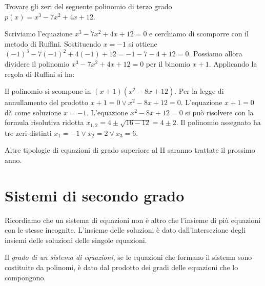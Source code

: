 \begin{esempio}
Trovare gli zeri del seguente polinomio di terzo grado \(p(x)=x^3-7x^2+4x+12\).

Scriviamo l'equazione \(x^3-7x^2+4x+12=0\) e cerchiamo di scomporre con il metodo 
di Ruffini. Sostituendo \(x=-1\) si ottiene 
\((-1)^3-7(-1)^2+4(-1)+12=-1-7-4+12=0\). 
Possiamo allora dividere il polinomio \(x^3-7x^2+4x+12=0\) per il binomio \(x+1\). 
Applicando la regola di Ruffini si ha:
\begin{center}

\end{center}
Il polinomio si scompone in \((x+1)(x^2-8x+12)\). Per la legge di annullamento 
del 
prodotto \(x+1=0\vee x^2-8x+12=0\). L'equazione \(x+1=0\) dà come soluzione \(x=-1\). 
L'equazione \(x^2-8x+12=0\) si può risolvere con la formula risolutiva ridotta 
\(x_{1,2}=4\pm \sqrt{16-12}=4\pm 2\). Il polinomio assegnato ha tre zeri distinti 
\(x_1=-1\vee x_2=2\vee x_3=6\).
\end{esempio}


Altre tipologie di equazioni di grado superiore al II saranno trattate il 
prossimo anno.

\section{Sistemi di secondo grado}
\label{sec:eq2gr_sistemi}

Ricordiamo che un sistema di equazioni non è altro che l'insieme di più 
equazioni con le stesse incognite. L'insieme delle soluzioni è dato 
dall'intersezione degli insiemi delle soluzioni delle singole equazioni.

\begin{definizione}
Il \emph{grado di un sistema di equazioni}, se le equazioni che formano il 
sistema sono costituite da polinomi, è dato dal prodotto dei gradi delle 
equazioni che lo compongono.
\end{definizione}

